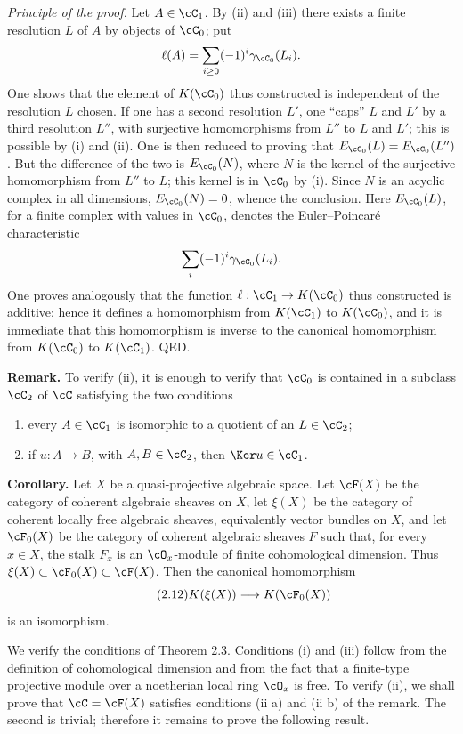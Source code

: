 \emph{Principle of the proof.} Let $A\in\cC_1$. By (ii) and (iii) there exists a finite resolution $L$ of $A$ by objects of $\cC_0$; put
\[
 \ell(A)=\sum_{i\geq 0}(-1)^i\gamma_{\cC_0}(L_i).
\]
One shows that the element of $K(\cC_0)$ thus constructed is independent of the resolution $L$ chosen. If one has a second resolution $L'$, one ``caps'' $L$ and $L'$ by a third resolution $L''$, with surjective homomorphisms from $L''$ to $L$ and $L'$; this is possible by (i) and (ii). One is then reduced to proving that $E_{\cC_0}(L)=E_{\cC_0}(L'')$. But the difference of the two is $E_{\cC_0}(N)$, where $N$ is the kernel of the surjective homomorphism from $L''$ to $L$; this kernel is in $\cC_0$ by (i). Since $N$ is an acyclic complex in all dimensions, $E_{\cC_0}(N)=0$, whence the conclusion. Here $E_{\cC_0}(L)$, for a finite complex with values in $\cC_0$, denotes the Euler--Poincar\'e characteristic
\[
 \sum_i (-1)^i\gamma_{\cC_0}(L_i).
\]
One proves analogously that the function $\ell:\cC_1\to K(\cC_0)$ thus constructed is additive; hence it defines a homomorphism from $K(\cC_1)$ to $K(\cC_0)$, and it is immediate that this homomorphism is inverse to the canonical homomorphism from $K(\cC_0)$ to $K(\cC_1)$. QED.

\textbf{Remark.} To verify (ii), it is enough to verify that $\cC_0$ is contained in a subclass $\cC_2$ of $\cC$ satisfying the two conditions
\begin{enumerate}[label=(ii \alph*)]
\item every $A\in\cC_1$ is isomorphic to a quotient of an $L\in\cC_2$;
\item if $u:A\to B$, with $A,B\in\cC_2$, then $\Ker u\in\cC_1$.
\end{enumerate}

\textbf{Corollary.} Let $X$ be a quasi-projective algebraic space. Let $\cF(X)$ be the category of coherent algebraic sheaves on $X$, let $\xi(X)$ be the category of coherent locally free algebraic sheaves, equivalently vector bundles on $X$, and let $\cF_0(X)$ be the category of coherent algebraic sheaves $F$ such that, for every $x\in X$, the stalk $F_x$ is an $\cO_x$-module of finite cohomological dimension. Thus $\xi(X)\subset\cF_0(X)\subset\cF(X)$. Then the canonical homomorphism
\begin{equation}\tag{2.12}
 K(\xi(X))\longrightarrow K(\cF_0(X))
\end{equation}
is an isomorphism.

We verify the conditions of Theorem 2.3. Conditions (i) and (iii) follow from the definition of cohomological dimension and from the fact that a finite-type projective module over a noetherian local ring $\cO_x$ is free. To verify (ii), we shall prove that $\cC=\cF(X)$ satisfies conditions (ii a) and (ii b) of the remark. The second is trivial; therefore it remains to prove the following result.

